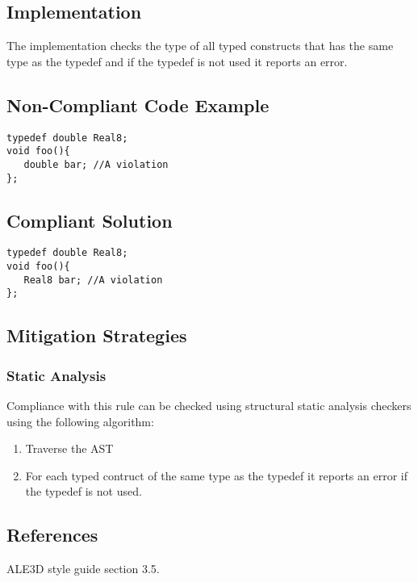 \subsection{Implementation}

The implementation checks the type of all typed constructs that has the
same type as the typedef and if the typedef is not used it reports an error.
\subsection{Non-Compliant Code Example}


\begin{verbatim}
typedef double Real8;
void foo(){
   double bar; //A violation
};
\end{verbatim}

\subsection{Compliant Solution}


\begin{verbatim}
typedef double Real8;
void foo(){
   Real8 bar; //A violation
};
\end{verbatim}

\subsection{Mitigation Strategies}
\subsubsection{Static Analysis} 

Compliance with this rule can be checked using structural static analysis checkers using the following algorithm:

\begin{enumerate}
\item Traverse the AST
\item For each typed contruct of the same type as the typedef it reports an error if the typedef is not used.
\end{enumerate}

\subsection{References}

ALE3D style guide section 3.5.
